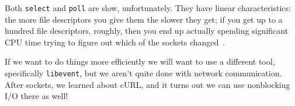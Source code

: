Both \texttt{select} and \texttt{poll} are slow, unfortunately. They have linear characteristics: the more file descriptors you give them the slower they get; if you get up to a hundred file descriptors, roughly, then you end up actually spending significant CPU time trying to figure out which of the sockets changed~\cite{pollvselect}.

If we want to do things more efficiently we will want to use a different tool, specifically \texttt{libevent}, but we aren't quite done with network communication. After sockets, we learned about cURL, and it turns out we can use nonblocking I/O there as well!





